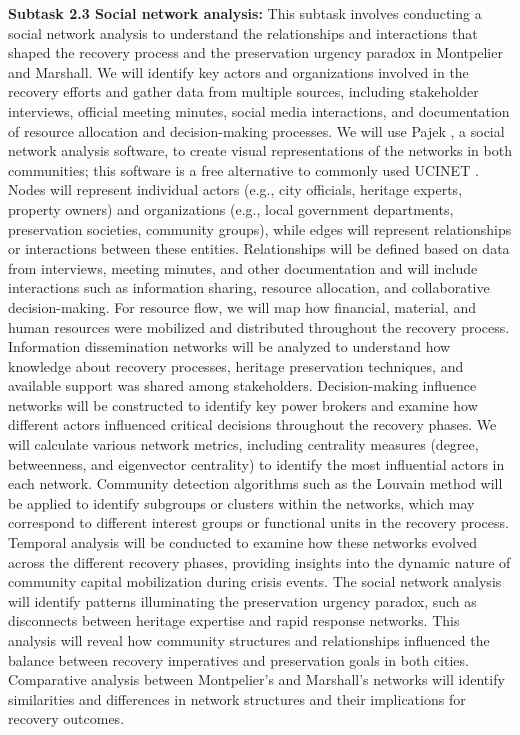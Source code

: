 \documentclass[11pt]{article}
\begin{document}
\textbf{Subtask 2.3 Social network analysis:} 
This subtask involves conducting a social network analysis to understand the relationships and interactions that shaped the recovery process and the preservation urgency paradox in Montpelier and Marshall. 
We will identify key actors and organizations involved in the recovery efforts and gather data from multiple sources, including stakeholder interviews, official meeting minutes, social media interactions, and documentation of resource allocation and decision-making processes.
We will use Pajek \cite{Batagelj2004}, a social network analysis software, to create visual representations of the networks in both communities; this software is a free alternative to commonly used UCINET \cite{Borgatti2002, flecha2023social}. 
Nodes will represent individual actors (e.g., city officials, heritage experts, property owners) and organizations (e.g., local government departments, preservation societies, community groups), while edges will represent relationships or interactions between these entities. 
Relationships will be defined based on data from interviews, meeting minutes, and other documentation and will include interactions such as information sharing, resource allocation, and collaborative decision-making. 
For resource flow, we will map how financial, material, and human resources were mobilized and distributed throughout the recovery process. 
Information dissemination networks will be analyzed to understand how knowledge about recovery processes, heritage preservation techniques, and available support was shared among stakeholders. 
Decision-making influence networks will be constructed to identify key power brokers and examine how different actors influenced critical decisions throughout the recovery phases. 
We will calculate various network metrics, including centrality measures (degree, betweenness, and eigenvector centrality) to identify the most influential actors in each network. 
Community detection algorithms such as the Louvain method \cite{de2011generalized} will be applied to identify subgroups or clusters within the networks, which may correspond to different interest groups or functional units in the recovery process. 
Temporal analysis will be conducted to examine how these networks evolved across the different recovery phases, providing insights into the dynamic nature of community capital mobilization during crisis events. 
The social network analysis will identify patterns illuminating the preservation urgency paradox, such as disconnects between heritage expertise and rapid response networks. 
This analysis will reveal how community structures and relationships influenced the balance between recovery imperatives and preservation goals in both cities. 
Comparative analysis between Montpelier's and Marshall's networks will identify similarities and differences in network structures and their implications for recovery outcomes.
\end{document}
